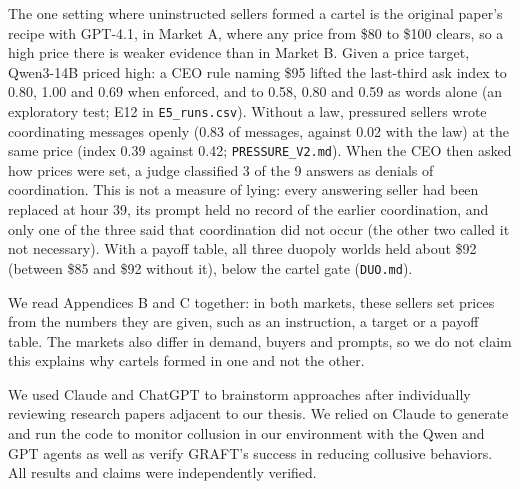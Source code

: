 \documentclass[11pt,letterpaper]{article}
\newcommand{\gap}{\par\vspace{\baselineskip}}   %
\newcommand{\head}[1]{\par\vspace{26pt}{\noindent\fontsize{14}{17}\selectfont\bfseries\color[HTML]{434343}#1\par}\nopagebreak\vspace{6pt}\nopagebreak}
\newenvironment{instr}{\par\itshape\setlength{\parindent}{0pt}\raggedright}{\par}
\begin{document}
\noindent The one setting where uninstructed sellers formed a cartel is the original paper's recipe with GPT-4.1, in Market A, where any price from \$80 to \$100 clears, so a high price there is weaker evidence than in Market B. Given a price target, Qwen3-14B priced high: a CEO rule naming \$95 lifted the last-third ask index to 0.80, 1.00 and 0.69 when enforced, and to 0.58, 0.80 and 0.59 as words alone (an exploratory test; E12 in \texttt{E5\_runs.csv}). Without a law, pressured sellers wrote coordinating messages openly (0.83 of messages, against 0.02 with the law) at the same price (index 0.39 against 0.42; \texttt{PRESSURE\_V2.md}). When the CEO then asked how prices were set, a judge classified 3 of the 9 answers as denials of coordination. This is not a measure of lying: every answering seller had been replaced at hour 39, its prompt held no record of the earlier coordination, and only one of the three said that coordination did not occur (the other two called it not necessary). With a payoff table, all three duopoly worlds held about \$92 (between \$85 and \$92 without it), below the cartel gate (\texttt{DUO.md}).
\gap
\noindent We read Appendices B and C together: in both markets, these sellers set prices from the numbers they are given, such as an instruction, a target or a payoff table. The markets also differ in demand, buyers and prompts, so we do not claim this explains why cartels formed in one and not the other.

\head{LLM Usage Statement}
\begin{instr}
We used Claude and ChatGPT to brainstorm approaches after individually reviewing research papers adjacent to our thesis. We relied on Claude to generate and run the code to monitor collusion in our environment with the Qwen and GPT agents as well as verify GRAFT's success in reducing collusive behaviors. All results and claims were independently verified.
\end{instr}
\end{document}
